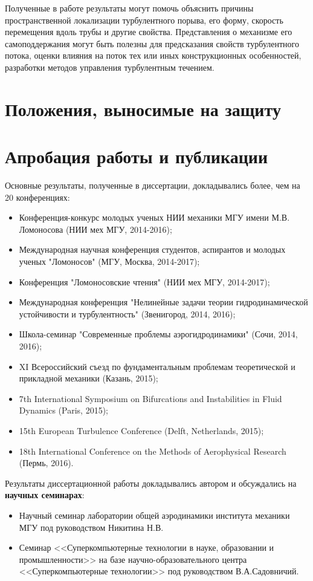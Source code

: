 Полученные в работе результаты могут помочь объяснить причины пространственной локализации турбулентного порыва, его форму, скорость перемещения вдоль трубы и другие свойства. Представления о механизме его самоподдержания могут быть полезны для предсказания свойств турбулентного потока, оценки влияния на поток тех или иных конструкционных особенностей, разработки методов управления турбулентным течением. 


\section{Положения, выносимые на защиту}

\section{Апробация работы и публикации}

Основные результаты, полученные в диссертации, докладывались более, чем на 20 конференциях: 
\begin{itemize}
\item Конференция-конкурс молодых ученых НИИ механики МГУ имени М.В. Ломоносова (НИИ мех МГУ, 2014-2016); 
\item Международная научная конференция студентов, аспирантов и молодых ученых "Ломоносов" (МГУ, Москва, 2014-2017); 
\item Конференция "Ломоносовские чтения" (НИИ мех МГУ, 2014-2017); 
\item Международная конференция "Нелинейные задачи теории гидродинамической устойчивости и турбулентность" (Звенигород, 2014, 2016); 
\item Школа-семинар "Современные проблемы аэрогидродинамики" (Сочи, 2014, 2016);  
\item XI Всероссийский съезд по фундаментальным проблемам теоретической и прикладной механики (Казань, 2015);
\item 7th International Symposium on Bifurcations and Instabilities in Fluid Dynamics (Paris, 2015);
\item 15th European Turbulence Conference (Delft, Netherlands, 2015); 
\item 18th International Conference on the Methods of Aerophysical Research (Пермь, 2016).
\end{itemize}

Результаты диссертационной работы докладывались автором и обсуждались на {\bf научных семинарах}:
\begin{itemize}
\item Научный семинар лаборатории общей аэродинамики института механики МГУ под руководством Никитина Н.В. 
\item Семинар <<Суперкомпьютерные технологии в науке, образовании и промышленности>> на базе научно-образовательного центра <<Суперкомпьютерные технологии>> под руководством В.А.Садовничий. 
\end{itemize}

